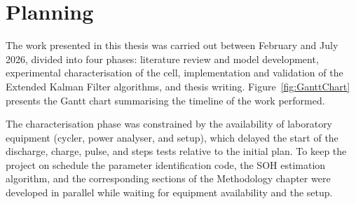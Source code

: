 \chapter{Planning}\label{sec:Planning}

The work presented in this thesis was carried out between February and July 2026, 
divided into four phases: literature review and model development, 
experimental characterisation of the cell, implementation and validation of the 
Extended Kalman Filter algorithms, and thesis writing. Figure~\ref{fig:GanttChart} 
presents the Gantt chart summarising the timeline of the work performed.

The characterisation phase was constrained by the availability of laboratory 
equipment (cycler, power analyser, and setup), which delayed the start of the discharge, 
charge, pulse, and steps tests relative to the initial plan. To keep the project on 
schedule the parameter identification code, the \ac{SOH} estimation algorithm, and 
the corresponding sections of the Methodology chapter were developed in parallel 
while waiting for equipment availability and the setup.


